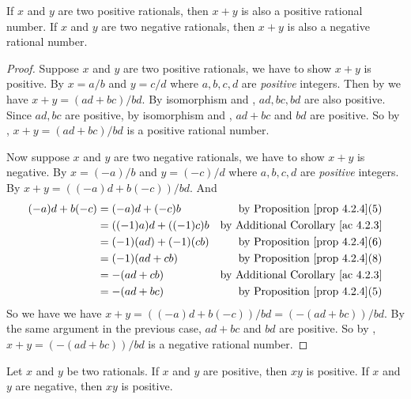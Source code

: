 \begin{additional corollary} \label{ac 4.2.4}
If \(x\) and \(y\) are two positive rationals, then \(x + y\) is also a positive rational number.
If \(x\) and \(y\) are two negative rationals, then \(x + y\) is also a negative rational number.
\end{additional corollary}

\begin{proof}
Suppose \(x\) and \(y\) are two positive rationals, we have to show \(x + y\) is positive.
By  \(x = a / b\) and \(y = c / d\) where \(a, b, c, d\) are \emph{positive} integers.
Then by  we have \(x + y = (ad + bc) / bd\).
By isomorphism and , \(ad, bc, bd\) are also positive.
Since \(ad, bc\) are positive, by isomorphism and , \(ad + bc\) and \(bd\) are positive.
So by , \(x + y = (ad + bc) / bd\) is a positive rational number.

Now suppose \(x\) and \(y\) are two negative rationals, we have to show \(x + y\) is negative.
By  \(x = (-a) / b\) and \(y = (-c) / d\) where \(a, b, c, d\) are \emph{positive} integers.
By  \(x + y = ((-a)d + b(-c)) / bd\).
And
\begin{align*}
      (-a)d + b(-c) & = (-a)d + (-c)b & \text{by \PROP{4.2.4}(5)} \\
                    & = ((-1)a)d + ((-1)c)b & \text{by \AC{4.2.3}} \\
                    & = (-1)(ad) + (-1)(cb) & \text{by \PROP{4.2.4}(6)} \\
                    & = (-1)(ad + cb) & \text{by \PROP{4.2.4}(8)} \\
                    & = -(ad + cb) & \text{by \AC{4.2.3}} \\
                    & = -(ad + bc) & \text{by \PROP{4.2.4}(5)}
\end{align*}
So we have we have \(x + y = ((-a)d + b(-c)) / bd = (-(ad + bc)) / bd\).
By the same argument in the previous case, \(ad + bc\) and \(bd\) are positive.
So by , \(x + y = (-(ad + bc)) / bd\) is a negative rational number.
\end{proof}

\begin{additional corollary} \label{ac 4.2.5}
Let \(x\) and \(y\) be two rationals.
If \(x\) and \(y\) are positive, then \(xy\) is positive.
If \(x\) and \(y\) are negative, then \(xy\) is positive.
\end{additional corollary}

